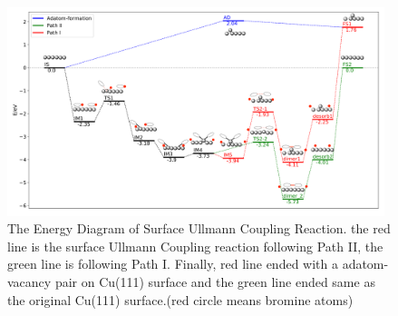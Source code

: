 \documentclass[%
 reprint,
 amsmath,amssymb,
 aps,
prb,
]{revtex4-2}
\begin{document}



\begin{figure}[hbt]
\centering
\includegraphics[width=0.98\textwidth]{Fig/completeenergy.png}
\caption{The Energy Diagram of Surface Ullmann Coupling Reaction.
the red line is the surface Ullmann Coupling reaction following Path II, the green line is following Path I. Finally, red line ended with a adatom-vacancy pair on Cu(111) surface and the green line ended same as the original Cu(111) surface.(red circle means bromine atoms)}
\label{fig:completeenergy}
\end{figure}
\end{document}
